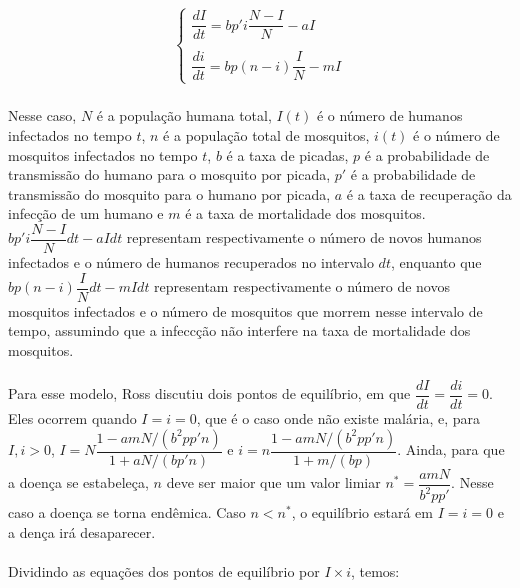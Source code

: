 \documentclass[12pt]{article}
\begin{document}
\begin{gather*}
\begin{cases}
\dfrac{dI}{dt} = bp'i\dfrac{N-I}{N} -aI\\
\\
\dfrac{di}{dt} = bp(n-i)\dfrac{I}{N} - mI
\end{cases}
\end{gather*}
\\
Nesse caso, $N$ é a população humana total, $I(t)$ é o número de humanos 
infectados no tempo $t$, $n$ é a população total de mosquitos, $i(t)$ é o número de mosquitos infectados no tempo $t$, $b$ é a taxa de picadas, $p$ é a probabilidade de transmissão do humano para o mosquito por picada, $p'$ é a probabilidade de transmissão do mosquito para o humano por picada, $a$ é a taxa de recuperação da infecção de um humano e $m$ é a taxa de mortalidade dos mosquitos. $bp'i\dfrac{N-I}{N}dt -aIdt$ representam respectivamente o número de novos humanos infectados e o número de humanos recuperados no intervalo $dt$, enquanto que $bp(n-i)\dfrac{I}{N}dt - mIdt$ representam respectivamente o número de novos mosquitos infectados e o número de mosquitos que morrem nesse intervalo de tempo, assumindo que a infeccção não interfere na taxa de mortalidade dos mosquitos.
\\\\
Para esse modelo, Ross discutiu dois pontos de equilíbrio, em que 
$\dfrac{dI}{dt} = \dfrac{di}{dt} = 0$. Eles ocorrem quando $I=i=0$, 
que é o caso onde não existe malária, e, para $I, i > 0$, 
$I = N\dfrac{1-amN/(b^2pp'n)}{1+aN/(bp'n)}$ e 
$i = n\dfrac{1-amN/(b^2pp'n)}{1+m/(bp)}$. Ainda, para que a doença se 
estabeleça, $n$ deve ser maior que um valor limiar $n^* = \dfrac{amN}{b^2pp'}$. 
Nesse caso a doença se torna endêmica. Caso $n<n^*$, o equilíbrio estará em 
$I=i=0$ e a dença irá desaparecer.
\\\\
Dividindo as equações dos pontos de equilíbrio por $I \times i$, temos:
\end{document}
